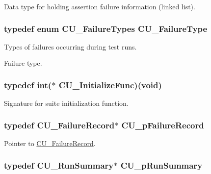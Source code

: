 Data type for holding assertion failure information (linked list). 

\hypertarget{group__Framework_ga763bde9f3b5258aaca9c65512d1b2219}{
\subsubsection[{C\-U\-\_\-\-Failure\-Type}]{\setlength{\rightskip}{0pt plus 5cm}typedef enum {\bf C\-U\-\_\-\-Failure\-Types}  {\bf C\-U\-\_\-\-Failure\-Type}}}\label{group__Framework_ga763bde9f3b5258aaca9c65512d1b2219}


Types of failures occurring during test runs. 

Failure type. \hypertarget{group__Framework_gaab4b8ad3aa3a3c222c43c8a330de11e3}{
\subsubsection[{C\-U\-\_\-\-Initialize\-Func}]{\setlength{\rightskip}{0pt plus 5cm}typedef int($\ast$ C\-U\-\_\-\-Initialize\-Func)(void)}}\label{group__Framework_gaab4b8ad3aa3a3c222c43c8a330de11e3}


Signature for suite initialization function. 

\hypertarget{group__Framework_gafe3d04f76bf2fac18a3b6a9fd9368308}{
\subsubsection[{C\-U\-\_\-p\-Failure\-Record}]{\setlength{\rightskip}{0pt plus 5cm}typedef {\bf C\-U\-\_\-\-Failure\-Record}$\ast$ {\bf C\-U\-\_\-p\-Failure\-Record}}}\label{group__Framework_gafe3d04f76bf2fac18a3b6a9fd9368308}


Pointer to \hyperlink{structCU__FailureRecord}{C\-U\-\_\-\-Failure\-Record}. 

\hypertarget{group__Framework_gad47d258dca538a934dccaeab9392b391}{
\subsubsection[{C\-U\-\_\-p\-Run\-Summary}]{\setlength{\rightskip}{0pt plus 5cm}typedef {\bf C\-U\-\_\-\-Run\-Summary}$\ast$ {\bf C\-U\-\_\-p\-Run\-Summary}}}\label{group__Framework_gad47d258dca538a934dccaeab9392b391}



